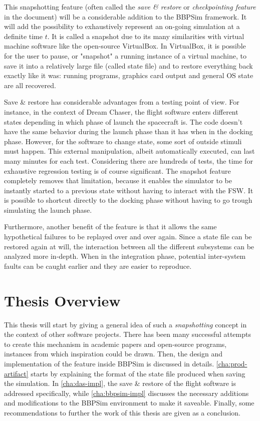 This snapshotting feature (often called the \textit{save \& restore} or \textit{checkpointing feature} in the document) will be a considerable addition to the \gls{BBPSim} framework. It will add the possibility to exhaustively represent an on-going simulation at a definite time $t$. It is called a snapshot due to its many similarities with virtual machine software like the open-source VirtualBox. In VirtualBox, it is possible for the user to pause, or "snapshot" a running instance of a virtual machine, to save it into a relatively large file (called state file) and to restore everything back exactly like it was: running programs, graphics card output and general OS state are all recovered.  

Save \& restore has considerable advantages from a testing point of view. For instance, in the context of Dream Chaser, the flight software enters different states depending in which phase of launch the spacecraft is. The code doesn't have the same behavior during the launch phase than it has when in the docking phase. However, for the software to change state, some sort of outside stimuli must happen. This external manipulation, albeit automatically executed, can last many minutes for each test. Considering there are hundreds of tests, the time for exhaustive regression testing is of course significant. The snapshot feature completely removes that limitation, because it enables the simulator to be instantly started to a previous state without having to interact with the \gls{FSW}. It is possible to shortcut directly to the docking phase without having to go trough simulating the launch phase. 

Furthermore, another benefit of the feature is that it allows the same hypothetical failures to be replayed over and over again. Since a state file can be restored again at will, the interaction between all the different subsystems can be analyzed more in-depth. When in the integration phase, potential inter-system faults can be caught earlier and they are easier to reproduce.  

\section{Thesis Overview}
This thesis will start by giving a general idea of such a \textit{snapshotting} concept in the context of other software projects. There has been many successful attempts to create this mechanism in academic papers and open-source programs, instances from which inspiration could be drawn. Then, the design and implementation of the feature inside \gls{BBPSim} is discussed in details. \autoref{cha:prod-artifact} starts by explaining the format of the state file produced when saving the simulation. In \autoref{cha:das-impl}, the save \& restore of the flight software is addressed specifically, while \autoref{cha:bbpsim-impl} discusses the necessary additions and modifications to the BBPSim environment to make it saveable. Finally, some recommendations to further the work of this thesis are given as a conclusion.
